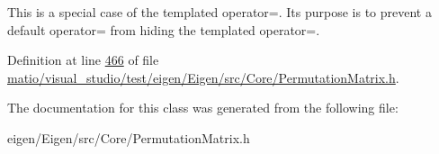 This is a special case of the templated operator=. Its purpose is to prevent a default operator= from hiding the templated operator=. 

Definition at line \hyperlink{matio_2visual__studio_2test_2eigen_2_eigen_2src_2_core_2_permutation_matrix_8h_source_l00466}{466} of file \hyperlink{matio_2visual__studio_2test_2eigen_2_eigen_2src_2_core_2_permutation_matrix_8h_source}{matio/visual\+\_\+studio/test/eigen/\+Eigen/src/\+Core/\+Permutation\+Matrix.\+h}.



The documentation for this class was generated from the following file\+:\begin{DoxyCompactItemize}
\item 
eigen/\+Eigen/src/\+Core/\+Permutation\+Matrix.\+h\end{DoxyCompactItemize}
